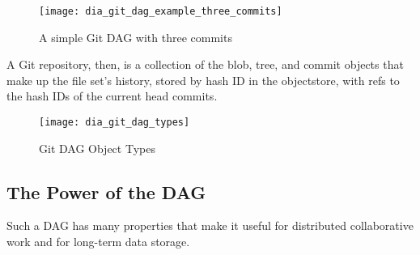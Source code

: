 \begin{figure}[h]
    \centering
    \texttt{[image: dia\_git\_dag\_example\_three\_commits]}
    \caption{A simple Git DAG with three commits}
    \label{dia_git_dag_example_three_commits}
\end{figure}

A Git repository, then, is a collection of the \gls{blob}, \gls{tree}, and
\gls{commit} objects that make up the file set's history, stored by hash ID in
the \gls{objectstore}, with \glspl{ref} to the hash IDs of the current head
\glspl{commit}\cite{git_initial_readme}.

\begin{figure}[]
    \centering
        \texttt{[image: dia\_git\_dag\_types]}
    \caption{Git DAG Object Types}
    \label{dia_git_dag_types}
\end{figure}


%

\subsection{The Power of the DAG}

Such a \gls{DAG} has many properties that make it useful for distributed
collaborative work and for long-term data storage.


